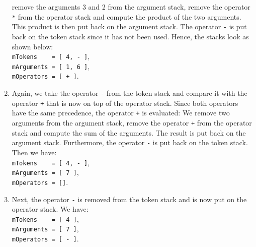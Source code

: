 \begin{enumerate}
      remove the arguments 3 and 2 from the argument stack, remove the operator
      \texttt{*} from the operator stack and compute the product of the two
      arguments.  This product is then put back on the 
      argument stack.  The operator \texttt{-} is put back on the token stack
      since it has not been used.  Hence, the stacks look as shown below: \\[0.2cm]
      \hspace*{1.3cm} \texttt{mTokens \ \ \ = [ 4, - ]}, \\[0.2cm]
      \hspace*{1.3cm} \texttt{mArguments = [ 1, 6 ]}, \\[0.2cm]
      \hspace*{1.3cm} \texttt{mOperators = [ + ]}. 
\item Again, we take the operator \texttt{-} from the token stack and
      compare it with the operator \texttt{+} that is now on top of the
      operator stack.  Since both operators have the same precedence, the operator
      \texttt{+} is evaluated:  We remove two arguments from the argument
      stack, remove the operator
      \texttt{+} from the operator stack  and compute the sum of the
      arguments.  The result is put back on the argument stack.  Furthermore, the operator
      \texttt{-} is put back on the token stack.
      Then we have: \\[0.2cm]
      \hspace*{1.3cm} \texttt{mTokens \ \ \ = [ 4, - ]}, \\[0.2cm]
      \hspace*{1.3cm} \texttt{mArguments = [ 7 ]}, \\[0.2cm]
      \hspace*{1.3cm} \texttt{mOperators = []}. 
\item Next, the operator \texttt{-} is removed from the token stack and is now
      put on the operator stack.  We have: \\[0.2cm]
      \hspace*{1.3cm} \texttt{mTokens \ \ \ = [ 4 ]}, \\[0.2cm]
      \hspace*{1.3cm} \texttt{mArguments = [ 7 ]}, \\[0.2cm]
      \hspace*{1.3cm} \texttt{mOperators = [ - ]}. 

\end{enumerate}
